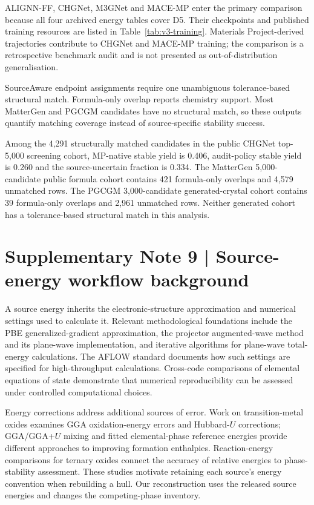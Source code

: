 \documentclass[a4paper,10pt]{article}
\begin{document}
ALIGNN-FF, CHGNet, M3GNet and MACE-MP enter the primary comparison because all four archived energy tables cover D5. Their checkpoints and published training resources are listed in Table~\ref{tab:v3-training}. Materials Project-derived trajectories contribute to CHGNet and MACE-MP training; the comparison is a retrospective benchmark audit and is not presented as out-of-distribution generalisation.

SourceAware endpoint assignments require one unambiguous tolerance-based structural match. Formula-only overlap reports chemistry support. Most MatterGen and PGCGM candidates have no structural match, so these outputs quantify matching coverage instead of source-specific stability success.

Among the 4,291 structurally matched candidates in the public CHGNet top-5,000 screening cohort, MP-native stable yield is 0.406, audit-policy stable yield is 0.260 and the source-uncertain fraction is 0.334. The MatterGen 5,000-candidate public formula cohort contains 421 formula-only overlaps and 4,579 unmatched rows. The PGCGM 3,000-candidate generated-crystal cohort contains 39 formula-only overlaps and 2,961 unmatched rows. Neither generated cohort has a tolerance-based structural match in this analysis.


\section*{Supplementary Note 9 | Source-energy workflow background}
A source energy inherits the electronic-structure approximation and numerical settings used to calculate it. Relevant methodological foundations include the PBE generalized-gradient approximation,\cite{perdew1996generalized} the projector augmented-wave method and its plane-wave implementation,\cite{blochl1994projector,kresse1999ultrasoft} and iterative algorithms for plane-wave total-energy calculations.\cite{kresse1996efficient} The AFLOW standard documents how such settings are specified for high-throughput calculations.\cite{calderon2015aflow} Cross-code comparisons of elemental equations of state demonstrate that numerical reproducibility can be assessed under controlled computational choices.\cite{lejaeghere2016reproducibility}

Energy corrections address additional sources of error. Work on transition-metal oxides examines GGA oxidation-energy errors and Hubbard-$U$ corrections;\cite{wang2006oxidation} GGA/GGA+$U$ mixing and fitted elemental-phase reference energies provide different approaches to improving formation enthalpies.\cite{jain2011formation,stevanovic2012correcting} Reaction-energy comparisons for ternary oxides connect the accuracy of relative energies to phase-stability assessment.\cite{hautier2012accuracy} These studies motivate retaining each source's energy convention when rebuilding a hull. Our reconstruction uses the released source energies and changes the competing-phase inventory.
\end{document}
